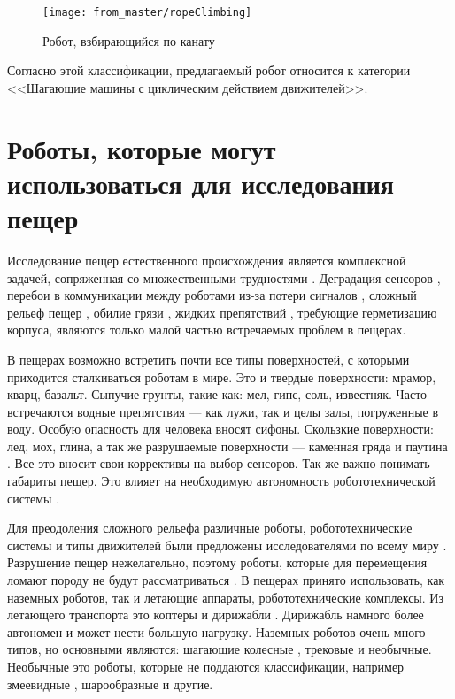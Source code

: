 \begin{figure}[H]
\centering\texttt{[image: from\_master/ropeClimbing]}
\caption{Робот, взбирающийся по канату}
\label{fig:ropeClimbing}
\end{figure}

Согласно этой классификации, предлагаемый робот относится к категории <<Шагающие машины с циклическим действием движителей>>.

\section{Роботы, которые могут использоваться для исследования пещер}

Исследование пещер естественного происхождения является комплексной задачей, сопряженная со множественными трудностями \cite{Zhang2017a, Frumkin2019}. Деградация сенсоров \cite{Huang2019}, перебои в коммуникации между роботами из-за потери сигналов \cite{Vaquero2018, Thangavelautham2017}, сложный рельеф пещер \cite{Thangavelautham2017}, обилие грязи \cite{Baker2004}, жидких препятствий \cite{Morris2006}, требующие герметизацию корпуса, являются только малой частью встречаемых проблем в пещерах. 

В пещерах возможно встретить почти все типы поверхностей, с которыми приходится сталкиваться роботам в мире. Это и твердые поверхности: мрамор, кварц, базальт. Сыпучие грунты, такие как: мел, гипс, соль, известняк. Часто встречаются водные препятствия — как лужи, так и целы залы, погруженные в воду. Особую опасность для человека вносят сифоны. Скользкие поверхности: лед, мох, глина, а так же разрушаемые поверхности — каменная гряда и паутина \cite{1960,1963,1969,1971}. Все это вносит свои коррективы на выбор сенсоров. Так же важно понимать габариты пещер. Это влияет на необходимую автономность робототехнической системы \cite{Mascarich2018a}. 

Для преодоления сложного рельефа различные роботы, робототехнические системы и типы движителей были предложены исследователями по всему миру \cite{Morris2006a}. Разрушение пещер нежелательно, поэтому роботы, которые для перемещения ломают породу не будут рассматриваться \cite{Semini2016}. В пещерах принято использовать, как наземных роботов, так и летающие аппараты, робототехнические комплексы. Из летающего транспорта это коптеры \cite{Papachristos2019,Scaramuzza2014,zinggMAVNavigationIndoor2010} и дирижабли \cite{Huang2019}. Дирижабль намного более автономен и может нести большую нагрузку. Наземных роботов очень много типов, но основными являются: шагающие \cite{Tan2016,Lynch2019} колесные \cite{Molyneaux2016,Vaquero2018}, трековые \cite{Reddy2015} и необычные. Необычные это роботы, которые не поддаются классификации, например змеевидные \cite{Ye2007,Borenstein2007}, шарообразные \cite{Thangavelautham2017,Dubowsky2008,Dang2019} и другие.

